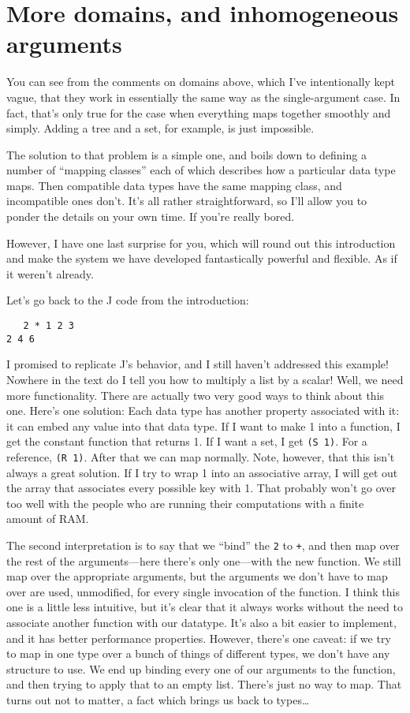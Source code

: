 \documentclass{article}
\newcommand{\code}[1]{\lstinline`#1`}
\begin{document}
\section{More domains, and inhomogeneous arguments}
You can see from the comments on domains above, which I've intentionally kept vague, that they work in essentially the same way as the single-argument case. In fact, that's only true for the case when everything maps together smoothly and simply. Adding a tree and a set, for example, is just impossible.

The solution to that problem is a simple one, and boils down to defining a number of ``mapping classes'' each of which describes how a particular data type maps. Then compatible data types have the same mapping class, and incompatible ones don't. It's all rather straightforward, so I'll allow you to ponder the details on your own time. If you're really bored.

However, I have one last surprise for you, which will round out this introduction and make the system we have developed fantastically powerful and flexible. As if it weren't already.

Let's go back to the J code from the introduction:
\begin{lstlisting}
   2 * 1 2 3
2 4 6
\end{lstlisting}
I promised to replicate J's behavior, and I still haven't addressed this example! Nowhere in the text do I tell you how to multiply a list by a scalar! Well, we need more functionality. There are actually two very good ways to think about this one. Here's one solution: Each data type has another property associated with it: it can embed any value into that data type. If I want to make 1 into a function, I get the constant function that returns 1. If I want a set, I get \code{(S 1)}. For a reference, \code{(R 1)}. After that we can map normally. Note, however, that this isn't always a great solution. If I try to wrap 1 into an associative array, I will get out the array that associates every possible key with 1. That probably won't go over too well with the people who are running their computations with a finite amount of RAM.

The second interpretation is to say that we ``bind'' the \code{2} to \code{+}, and then map over the rest of the arguments---here there's only one---with the new function. We still map over the appropriate arguments, but the arguments we don't have to map over are used, unmodified, for every single invocation of the function. I think this one is a little less intuitive, but it's clear that it always works without the need to associate another function with our datatype. It's also a bit easier to implement, and it has better performance properties. However, there's one caveat: if we try to map in one type over a bunch of things of different types, we don't have any structure to use. We end up binding every one of our arguments to the function, and then trying to apply that to an empty list. There's just no way to map. That turns out not to matter, a fact which brings us back to types\ldots{}
\end{document}
